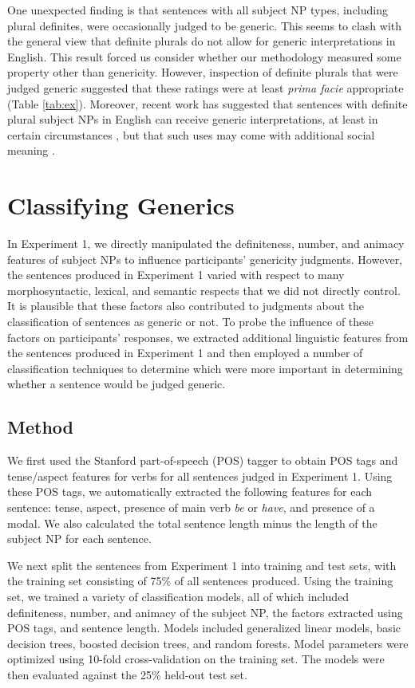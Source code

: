 \documentclass[10pt,letterpaper]{article}
\begin{document}
One unexpected finding is that sentences with all subject NP types, including plural definites, were occasionally judged to be generic. This seems to clash with the general view that definite plurals do not allow for generic interpretations in English. This result forced us consider whether our methodology measured some property other than genericity. However, inspection of definite plurals that were judged generic suggested that these ratings were at least \emph{prima facie} appropriate (Table \ref{tab:ex}). Moreover, recent work has suggested that sentences with definite plural subject NPs in English can receive generic interpretations, at least in certain circumstances \cite{FarkasDeSwart2007}, but that such uses may come with additional social meaning \cite{Acton:2014}.

\section{Classifying Generics}

In Experiment 1, we directly manipulated the definiteness, number, and animacy features of subject NPs to influence participants' genericity judgments. However, the sentences produced in Experiment 1 varied with respect to many morphosyntactic, lexical, and semantic respects that we did not directly control. It is plausible that these factors also contributed to judgments about the classification of sentences as generic or not. To probe the influence of these factors on participants' responses, we extracted additional linguistic features from the sentences produced in Experiment 1 and then employed a number of classification techniques to determine which were more important in determining whether a sentence would be judged generic.

\subsection{Method}

We first used the Stanford part-of-speech (POS) tagger \cite{Toutanova:2003} to obtain POS tags and tense/aspect features for verbs for all sentences judged in Experiment 1. Using these POS tags, we automatically extracted the following features for each sentence: tense, aspect, presence of main verb \textit{be} or \textit{have}, and presence of a modal. We also calculated the total sentence length minus the length of the subject NP for each sentence.

We next split the sentences from Experiment 1 into training and test sets, with the training set consisting of 75\% of all sentences produced. Using the training set, we trained a variety of classification models, all of which included definiteness, number, and animacy of the subject NP, the factors extracted using POS tags, and sentence length. Models included generalized linear models, basic decision trees, boosted decision trees, and random forests. Model parameters were optimized using 10-fold cross-validation on the training set. The models were then evaluated against the 25\% held-out test set.
\end{document}
